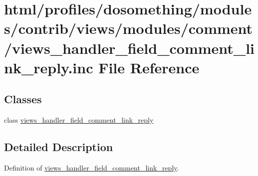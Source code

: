 \hypertarget{views__handler__field__comment__link__reply_8inc}{
\section{html/profiles/dosomething/modules/contrib/views/modules/comment/views\_\-handler\_\-field\_\-comment\_\-link\_\-reply.inc File Reference}
\label{views__handler__field__comment__link__reply_8inc}
}
\subsection*{Classes}
\begin{DoxyCompactItemize}
\item 
class \hyperlink{classviews__handler__field__comment__link__reply}{views\_\-handler\_\-field\_\-comment\_\-link\_\-reply}
\end{DoxyCompactItemize}


\subsection{Detailed Description}
Definition of \hyperlink{classviews__handler__field__comment__link__reply}{views\_\-handler\_\-field\_\-comment\_\-link\_\-reply}. 